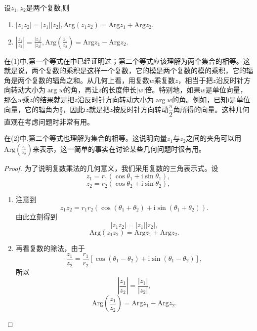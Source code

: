 \documentclass[../../main.tex]{subfiles}
\begin{document}
\begin{theorem}\label{theorem:复数辐角的性质}
设$z_1,z_2$是两个复数,则
\begin{enumerate}[(1)]
\item $|z_1z_2| = |z_1||z_2|,\mathrm{Arg}(z_1z_2) = \mathrm{Arg}z_1 + \mathrm{Arg}z_2.$

\item $\left| \frac{z_1}{z_2} \right| = \frac{|z_1|}{|z_2|},
\mathrm{Arg}\left( \frac{z_1}{z_2} \right) = \mathrm{Arg}z_1 - \mathrm{Arg}z_2.$
\end{enumerate}
\end{theorem}
\begin{note}
在(1)中,第一个等式在中已经证明过；第二个等式应该理解为两个集合的相等。这就是说，两个复数的乘积是这样一个复数，它的模是两个复数的模的乘积，它的辐角是两个复数的辐角之和。从几何上看，用复数\(w\)乘复数\(z\)，相当于把\(z\)沿反时针方向转动大小为\(\arg w\)的角，再让\(z\)的长度伸长\(|w|\)倍。特别地，如果\(w\)是单位向量，那么\(w\)乘\(z\)的结果就是把\(z\)沿反时针方向转动大小为\(\arg w\)的角。例如，已知\(\mathrm{i}\)是单位向量，它的辐角为\(\frac{\pi}{2}\)，因此\(\mathrm{i}z\)就是把\(z\)按反时针方向转动\(\dfrac{\pi}{2}\)角所得的向量。这种几何直观在考虑问题时非常有用。

在(2)中,第二个等式也理解为集合的相等。这说明向量\(z_1\)与\(z_2\)之间的夹角可以用\(\mathrm{Arg}\left( \frac{z_1}{z_2} \right)\)来表示，这一简单的事实在讨论某些几何问题时很有用。
\end{note}
\begin{proof}
为了说明复数乘法的几何意义，我们采用复数的三角表示式。设
\[
z_1 = r_1(\cos\theta_1 + \mathrm{i}\sin\theta_1),
\]
\[
z_2 = r_2(\cos\theta_2 + \mathrm{i}\sin\theta_2),
\]
\begin{enumerate}[(1)]
\item 注意到
\[
z_1z_2 = r_1r_2(\cos(\theta_1 + \theta_2) + \mathrm{i}\sin(\theta_1 + \theta_2)).
\]
由此立刻得到
\[
|z_1z_2| = |z_1||z_2|,
\]
\[
\mathrm{Arg}(z_1z_2) = \mathrm{Arg}z_1 + \mathrm{Arg}z_2.
\]

\item 再看复数的除法，由于
\[
\frac{z_1}{z_2} = \frac{r_1}{r_2}[\cos(\theta_1 - \theta_2) + \mathrm{i}\sin(\theta_1 - \theta_2)],
\]
所以
\[
\left| \frac{z_1}{z_2} \right| = \frac{|z_1|}{|z_2|},
\]
\[
\mathrm{Arg}\left( \frac{z_1}{z_2} \right) = \mathrm{Arg}z_1 - \mathrm{Arg}z_2.
\]
\end{enumerate}

\end{proof}
\end{document}
